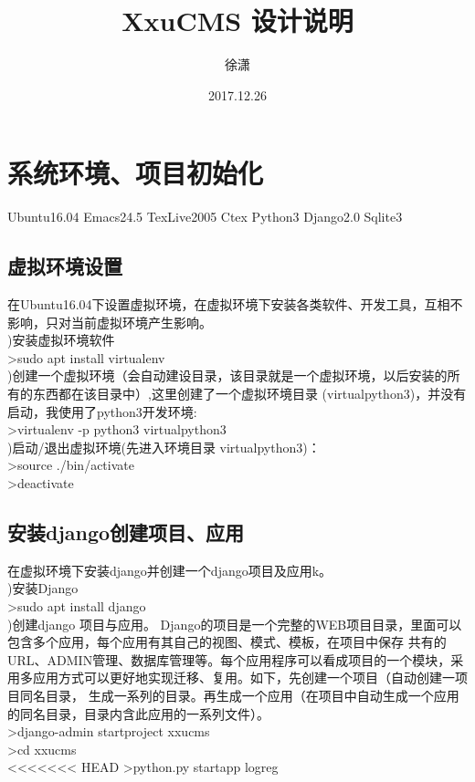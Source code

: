 \documentclass[a4paper]{ctexart}
\author{徐潇}
\title{XxuCMS 设计说明}
\date{2017.12.26}
\begin{document}
  \maketitle  %

  \section{系统环境、项目初始化}
  Ubuntu16.04 Emacs24.5 TexLive2005 Ctex Python3 Django2.0 Sqlite3
   \subsection{虚拟环境设置}
      在Ubuntu16.04下设置虚拟环境，在虚拟环境下安装各类软件、开发工具，互相不影响，只对当前虚拟环境产生影响。\\    
      )安装虚拟环境软件\\      
      \indent >sudo apt install virtualenv \\
      )创建一个虚拟环境（会自动建设目录，该目录就是一个虚拟环境，以后安装的所有的东西都在该目录中）,这里创建了一个虚拟环境目录
      (virtualpython3)，并没有启动，我使用了python3开发环境:\\
       \indent>virtualenv -p python3 virtualpython3 \\            
       )启动/退出虚拟环境(先进入环境目录 virtualpython3)：\\
       \indent >source ./bin/activate \\
       \indent >deactivate \\
    \subsection{安装django创建项目、应用}
      在虚拟环境下安装django并创建一个django项目及应用k。\\
      )安装Django \\
      \indent >sudo apt install django \\
      )创建django 项目与应用。 Django的项目是一个完整的WEB项目目录，里面可以包含多个应用，每个应用有其自己的视图、模式、模板，在项目中保存
      共有的URL、ADMIN管理、数据库管理等。每个应用程序可以看成项目的一个模块，采用多应用方式可以更好地实现迁移、复用。如下，先创建一个项目（自动创建一项目同名目录，
      生成一系列的目录。再生成一个应用（在项目中自动生成一个应用的同名目录，目录内含此应用的一系列文件）。\\
      \indent >django-admin startproject xxucms \\
      \indent >cd xxucms \\ 
<<<<<<< HEAD
      \indent >python.py startapp logreg \\
      \indent
\end{document}
